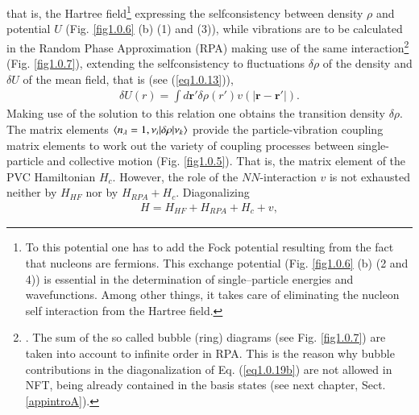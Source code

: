 that is, the Hartree field\footnote{To this potential one has to add the Fock potential resulting from the fact that nucleons are fermions. This exchange potential (Fig. \ref{fig1.0.6} (b) (2 and 4)) is essential in the determination of single--particle energies and wavefunctions. Among other things, it takes care of eliminating the nucleon self interaction from the Hartree field.} expressing the selfconsistency between density $\rho$ and potential $U$ (Fig. \ref{fig1.0.6} (b) (1) and (3)), while vibrations are to be calculated in the Random Phase Approximation (RPA) making use of the same interaction\footnote{\cite{Bohm:51,Bohm:53}. The sum of the so called bubble (ring) diagrams (see Fig. \ref{fig1.0.7}) are taken into account to infinite order in RPA. This is the reason why bubble contributions in the diagonalization of Eq. (\ref{eq1.0.19b}) are not allowed in NFT, being already contained in the basis states (see next chapter, Sect. \ref{appintroA}).} (Fig. \ref{fig1.0.7}), extending the selfconsistency to fluctuations $\delta\rho$ of the density and $\delta U$ of the mean field, that is (see (\ref{eq1.0.13})),
\begin{align}\label{eq1.0.19}
\delta U(r)=\int d\mathbf r' \delta \rho(r')v\left(|\mathbf r-\mathbf r'|\right).
\end{align}
Making use  of the solution to this relation  one obtains the transition density $\delta\rho$. The matrix elements $\langle {n_\lambda=1, \nu_i|\delta\rho|\nu_k} \rangle$ provide the  particle-vibration coupling matrix elements to work out the variety of coupling processes between single-particle and collective motion (Fig. \ref{fig1.0.5}). That is, the matrix element of the PVC Hamiltonian $H_c$. However, the role of the $NN$-interaction $v$ is not exhausted neither by $H_{HF}$ nor by $H_{RPA}+H_c$. Diagonalizing 
\begin{align}\label{eq1.0.19b}
H=H_{HF}+H_{RPA}+H_c+v,
\end{align}
